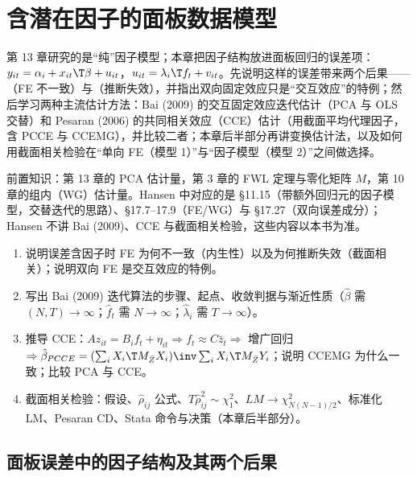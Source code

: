 \chapter{含潜在因子的面板数据模型}
\label{ch:U14a-latent}

第 13 章研究的是“纯”因子模型；本章把因子结构放进面板回归的误差项：$y_{it}=\alpha_i+x_{it}\T\beta+u_{it}$，$u_{it}=\lambda_i\T f_t+v_{it}$。先说明这样的误差带来两个后果——（FE 不一致）与（推断失效），并指出双向固定效应只是“交互效应”的特例；然后学习两种主流估计方法：Bai (2009) 的交互固定效应迭代估计（PCA 与 OLS 交替）和 Pesaran (2006) 的共同相关效应（CCE）估计（用截面平均代理因子，含 PCCE 与 CCEMG），并比较二者；本章后半部分再讲变换估计法，以及如何用截面相关检验在“单向 FE（模型 1）”与“因子模型（模型 2）”之间做选择。

前置知识：第 13 章的 PCA 估计量，第 3 章的 FWL 定理与零化矩阵 $M$，第 10 章的组内（WG）估计量。Hansen 中对应的是 §11.15（带额外回归元的因子模型，交替迭代的思路）、§17.7--17.9（FE/WG）与 §17.27（双向误差成分）；Hansen 不讲 Bai (2009)、CCE 与截面相关检验，这些内容以本书为准。

\begin{keypt}[本章最可能的考法]
\begin{enumerate}
  \item 说明误差含因子时 FE 为何不一致（内生性）以及为何推断失效（截面相关）；说明双向 FE 是交互效应的特例。
  \item 写出 Bai (2009) 迭代算法的步骤、起点、收敛判据与渐近性质（$\hat\beta$ 需 $(N,T)\to\infty$；$\hat f_t$ 需 $N\to\infty$；$\hat\lambda_i$ 需 $T\to\infty$）。
  \item 推导 CCE：$Az_{it}=B_if_t+\eta_{it}\Rightarrow f_t\approx C\bar z_t\Rightarrow$ 增广回归 $\Rightarrow \hat\beta_{PCCE}=(\sum_i X_i\T M_{\bar Z}X_i)\inv\sum_i X_i\T M_{\bar Z}Y_i$；说明 CCEMG 为什么一致；比较 PCA 与 CCE。
  \item 截面相关检验：假设、$\hat\rho_{ij}$ 公式、$T\hat\rho_{ij}^2\sim\chi^2_1$、$LM\to\chi^2_{N(N-1)/2}$、标准化 LM、Pesaran CD、Stata 命令与决策（本章后半部分）。
\end{enumerate}
\end{keypt}

\section{面板误差中的因子结构及其两个后果}\label{sec:U14a-twocons}

